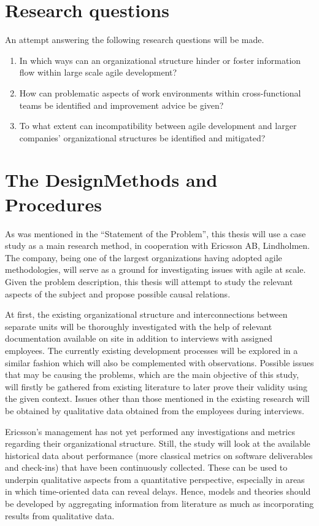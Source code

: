 \documentclass[paper=a4, fontsize=11pt]{scrartcl}
\numberwithin{equation}{section}		%
\numberwithin{figure}{section}			%
\numberwithin{table}{section}			%
\newcommand{\quotes}[1]{``#1''}
\begin{document}
\section{Research questions}

An attempt answering the following research questions will be made.

\begin{enumerate}
   \item In which ways can an organizational structure hinder or foster information flow within large scale agile development?
   \item How can problematic aspects of work environments within cross-functional teams be identified and improvement advice be given?
   \item To what extent can incompatibility between agile development and larger companies' organizational structures be identified and mitigated?
\end{enumerate}

\section{The Design\textemdash Methods and Procedures}

As was mentioned in the \quotes{Statement of the Problem}, this thesis will use a case study as a main research method, in cooperation with Ericsson AB, Lindholmen. The company, being one of the largest organizations having adopted agile methodologies, will serve as a ground for investigating issues with agile at scale. Given the problem description, this thesis will attempt to study the relevant aspects of the subject and propose possible causal relations.

At first, the existing organizational structure and interconnections between separate units will be thoroughly investigated with the help of relevant documentation available on site in addition to interviews with assigned employees. The currently existing development processes will be explored in a similar fashion which will also be complemented with observations.
Possible issues that may be causing the problems, which are the main objective of this study, will firstly be gathered from existing literature to later prove their validity using the given context. Issues other than those mentioned in the existing research will be obtained by qualitative data obtained from the employees during interviews.

Ericsson's management has not yet performed any investigations and metrics regarding their organizational structure. Still, the study will look at the available historical data about performance (more classical metrics on software deliverables and check-ins) that have been continuously collected. These can be used to underpin qualitative aspects from a quantitative perspective, especially in areas in which time-oriented data can reveal delays. Hence, models and theories should be developed by aggregating information from literature as much as incorporating results from qualitative data.
\end{document}
